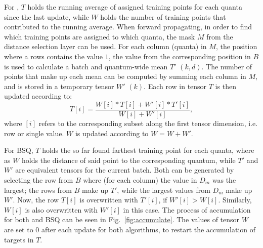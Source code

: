 			For \kmeans{}, $T$ holds the running average of assigned training points for each quanta since the last update, while $W$ holds the number of training points that contributed to the running average.
			When forward propagating, in order to find which training points are assigned to which quanta, the mask $M$ from the distance selection layer can be used.
			For each column (quanta) in $M$, the position where a rows contains the value $1$, the value from the corresponding position in $B$ is used to calculate a batch and quantum-wide mean $T'$ $(k, d)$.
			The number of points that make up each mean can be computed by summing each column in $M$, and is stored in a temporary tensor $W'$ $(k)$.
			Each row in tensor $T$ is then updated according to:
			\begin{equation}
				T[i] = \frac{W[i] * T[i] + W'[i] * T'[i]}{W[i] + W'[i]},
			\end{equation}			
			\noindent where $[i]$ refers to the corresponding subset along the first tensor dimension, i.e. row or single value.
			$W$ is updated according to $W = W + W'$. 
			
			For \ac{BSQ}, $T$ holds the so far found farthest training point for each quanta, where as $W$ holds the distance of said point to the corresponding quantum, while $T'$ and $W'$ are equivalent tensors for the current batch.
			Both can be generated by selecting the row from $B$ where (for each column) the value in $D_m$ was the largest; the rows from $B$ make up $T'$, while the largest values from $D_m$ make up $W'$.
			Now, the row $T[i]$ is overwritten with $T'[i]$, if $W'[i] > W[i]$.
			Similarly, $W[i]$ is also overwritten with $W'[i]$ in this case.
			The process of accumulation for both \kmeans{} and \ac{BSQ} can be seen in Fig.~\ref{fig:accumulate}.
			The values of tensor $W$ are set to $0$ after each update for both algorithms, to restart the accumulation of targets in $T$.
			
